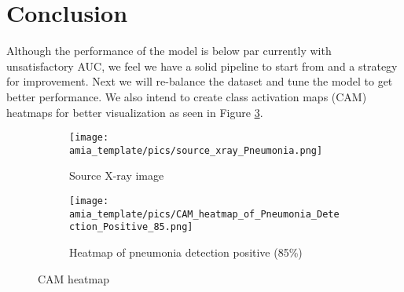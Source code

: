 \documentclass{amia}
\begin{document}
\section*{Conclusion}
Although the performance of the model is below par currently with unsatisfactory AUC, we feel we have a solid pipeline to start from and a strategy for improvement. Next we will re-balance the dataset and tune the model to get better performance. We also intend to create class activation maps (CAM) heatmaps for better visualization as seen in Figure \ref{fig:cam_heatmap}.

\makeatletter

\bigskip

\begin{figure}
\centering
\begin{subfigure}{.4\textwidth}
  \centering
  \texttt{[image: amia\_template/pics/source\_xray\_Pneumonia.png]}
  \caption{Source X-ray image}
  \label{fig:sub1}
\end{subfigure}
\begin{subfigure}{.4\textwidth}
  \centering
  \texttt{[image: amia\_template/pics/CAM\_heatmap\_of\_Pneumonia\_Detection\_Positive\_85.png]}
  \caption{Heatmap of pneumonia detection positive (85\%)}
  \label{fig:sub2}
\end{subfigure}
\caption{CAM heatmap \cite{ref5} }
\label{fig:cam_heatmap}
\end{figure}

\renewcommand{\@biblabel}[1]{\hfill #1.}
\makeatother
\end{document}
